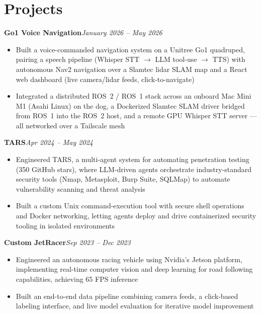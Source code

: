 \documentclass[11pt, letterpaper]{article}
\newcommand{\entryhead}[2]{%
    \noindent\textbf{#1}\hfill\textit{#2}\\[-5pt]%
}
\begin{document}
\section{Projects}

\entryhead{Go1 Voice Navigation}{January 2026 -- May 2026}
\begin{itemize}
    \item Built a voice-commanded navigation system on a Unitree Go1 quadruped, pairing a speech pipeline (Whisper STT $\to$ LLM tool-use $\to$ TTS) with autonomous Nav2 navigation over a Slamtec lidar SLAM map and a React web dashboard (live camera/lidar feeds, click-to-navigate)
    \item Integrated a distributed ROS~2 / ROS~1 stack across an onboard Mac Mini M1 (Asahi Linux) on the dog, a Dockerized Slamtec SLAM driver bridged from ROS~1 into the ROS~2 host, and a remote GPU Whisper STT server --- all networked over a Tailscale mesh
\end{itemize}

\vspace{4pt}

\entryhead{TARS}{Apr 2024 -- May 2024}
\begin{itemize}
    \item Engineered TARS, a multi-agent system for automating penetration testing (350 GitHub stars), where LLM-driven agents orchestrate industry-standard security tools (Nmap, Metasploit, Burp Suite, SQLMap) to automate vulnerability scanning and threat analysis
    \item Built a custom Unix command-execution tool with secure shell operations and Docker networking, letting agents deploy and drive containerized security tooling in isolated environments
\end{itemize}

\vspace{4pt}

\entryhead{Custom JetRacer}{Sep 2023 -- Dec 2023}
\begin{itemize}
    \item Engineered an autonomous racing vehicle using Nvidia's Jetson platform, implementing real-time computer vision and deep learning for road following capabilities, achieving 65 FPS inference
    \item Built an end-to-end data pipeline combining camera feeds, a click-based labeling interface, and live model evaluation for iterative model improvement
\end{itemize}
\end{document}
